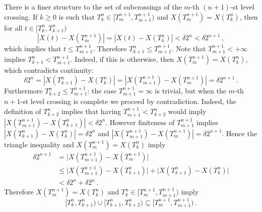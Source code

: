 \documentclass[a4paper]{article}
\begin{document}
There is a finer structure to the set of subcrossings of the $m$-th $(n+1)$-st level
crossing. If $k\geq 0$ is such that $T_k^n \in [T_m^{n+1}, T_{m+1}^{n+1})$ and
$X(T_m^{n+1}) = X(T_k^n)$, then for all $t \in [T_k^n, T_{k+1}^n)$
\begin{equation*}
    |X(t) - X(T_m^{n+1})| = |X(t) - X(T_k^n)| < \delta 2^n < \delta 2^{n+1} \,,
\end{equation*}
which implies that $t \leq T_{m+1}^{n+1}$. Therefore $T_{k+1}^n \leq T_{m+1}^{n+1}$.
Note that $T_{m+1}^{n+1} < +\infty$ implies $T_{k+1}^n < T_{m+1}^{n+1}$. Indeed,
if this is otherwise, then $X(T_m^{n+1}) = X(T_k^n)$, which contradicts continuity:
\begin{equation*}
    \delta 2^n = |X(T_{k+1}^n) - X(T_k^n)|
        = |X(T_{m+1}^{n+1}) - X(T_m^{n+1})| = \delta 2^{n+1}\,.
\end{equation*}
Furthermore $T_{k+2}^n \leq T_{m+1}^{n+1}$: the case $T_{m+1}^{n+1} = \infty$ is trivial,
but when the $m$-th $n+1$-st level crossing is complete we proceed by contradiction.
Indeed, the definition of $T_{k+2}^n$ implies that having $T_{m+1}^{n+1} < T_{k+2}^n$
would imply $|X(T_{m+1}^{n+1}) - X(T_{k+1}^n)| < \delta 2^n$. However finiteness
of $T_{m+1}^{n+1}$ implies $|X(T_{k+1}^n) - X(T_k^n)| = \delta 2^n$ and
$|X(T_{m+1}^{n+1}) - X(T_m^{n+1})| = \delta 2^{n+1}$. Hence the triangle inequality
and $X(T_m^{n+1}) = X(T_k^n)$ imply
\begin{align*}
    \delta 2^{n+1}
        &= \bigl|X(T_{m+1}^{n+1}) - X(T_m^{n+1})\bigr| \\
        &\leq \bigl|X(T_{m+1}^{n+1}) - X(T_{k+1}^n)\bigr|
           + \bigl|X(T_{k+1}^n) - X(T_k^n)\bigr| \\
        &< \delta 2^n + \delta 2^n \,.
\end{align*}
Therefore $X(T_m^{n+1}) = X(T_k^n)$ and $T_k^n \in [T_m^{n+1}, T_{m+1}^{n+1})$ imply
\begin{equation} \label{eq:duration_partition}
    \bigl[T_k^n, T_{k+1}^n\bigr) \cup \bigl[T_{k+1}^n, T_{k+2}^n\bigr)
        \subseteq \bigl[T_m^{n+1}, T_{m+1}^{n+1}\bigr)
    \,.
\end{equation}
\end{document}
